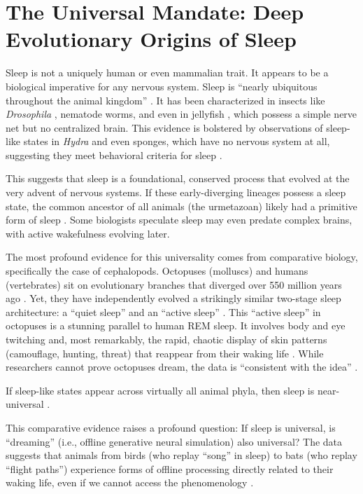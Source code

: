 \section{The Universal Mandate: Deep Evolutionary Origins of Sleep}\label{sec:universal_mandate}

Sleep is not a uniquely human or even mammalian trait. It appears to be a biological imperative for any nervous system. Sleep is ``nearly ubiquitous throughout the animal kingdom'' \citep{lesku2016evolutionary}. It has been characterized in insects like \textit{Drosophila} \citep{tian2023drosophila}, nematode worms, and even in jellyfish \citep{nathan2017jellyfish}, which possess a simple nerve net but no centralized brain. This evidence is bolstered by observations of sleep-like states in \textit{Hydra} \citep{kanaya2020hydra} and even sponges, which have no nervous system at all, suggesting they meet behavioral criteria for sleep \citep{bsj2020jellyfish}.

This suggests that sleep is a foundational, conserved process that evolved at the very advent of nervous systems. If these early-diverging lineages possess a sleep state, the common ancestor of all animals (the urmetazoan) likely had a primitive form of sleep \citep{lesku2016evolutionary}. Some biologists speculate sleep may even predate complex brains, with active wakefulness evolving later.

The most profound evidence for this universality comes from comparative biology, specifically the case of cephalopods. Octopuses (molluscs) and humans (vertebrates) sit on evolutionary branches that diverged over 550 million years ago \citep{medeiros2023octopus}. Yet, they have independently evolved a strikingly similar two-stage sleep architecture: a ``quiet sleep'' and an ``active sleep'' \citep{ramirezplascencia2023nature, medeiros2023octopus}. This ``active sleep'' in octopuses is a stunning parallel to human REM sleep. It involves body and eye twitching \citep{medeiros2023octopus, ramirezplascencia2023nature} and, most remarkably, the rapid, chaotic display of skin patterns (camouflage, hunting, threat) that reappear from their waking life \citep{ramirezplascencia2023nature}. While researchers cannot prove octopuses dream, the data is ``consistent with the idea'' \citep{medeiros2023octopus}.

If sleep-like states appear across virtually all animal phyla, then sleep is near-universal \citep{nathan2017jellyfish, SheinIdelson2016_Science_ReptileREM}.

This comparative evidence raises a profound question: If sleep is universal, is ``dreaming'' (i.e., offline generative neural simulation) also universal? The data suggests that animals from birds (who replay ``song'' in sleep) to bats (who replay ``flight paths'') experience forms of offline processing directly related to their waking life, even if we cannot access the phenomenology \citep{wilson1994reactivation, omer2025batreplay, suga2003, tian2023drosophila, lesku2016evolutionary}.

